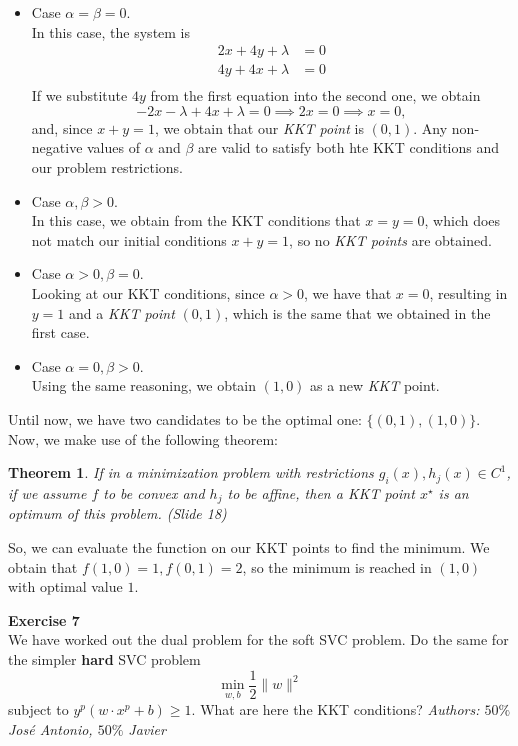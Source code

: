 \documentclass[11pt,table]{article}
\newtheorem{nth}{Theorem}
\newenvironment{problem}[2][Exercise]
{ \begin{mdframed}[backgroundcolor=gray!20] \textbf{#1 #2} \\}
	{\hspace{0.0cm}\newline\newline \emph{Authors: \(50\%\) José Antonio, \(50\%\) Javier}  \end{mdframed}}
\newcommand\norm[1]{\lVert#1\rVert}
\begin{document}
	\begin{itemize}
		\item Case \(\alpha = \beta = 0\).\\
		In this case, the system is
		\begin{align*}
			2x + 4y + \lambda & = 0 \\
			4y + 4x + \lambda & = 0 \\
		\end{align*}
		If we substitute \(4y\) from the first equation into the second one, we obtain
		\[
		-2x - \lambda + 4x + \lambda = 0 \implies 2x = 0  \implies x = 0,
		\]
		and, since \(x+y = 1\), we obtain that our \emph{KKT point} is \((0,1)\). Any non-negative values of $\alpha$ and $\beta$ are valid to satisfy both hte KKT conditions and our problem restrictions.
		\item Case \(\alpha, \beta > 0\).\\
		In this case, we obtain from the KKT conditions that \(x=  y = 0\), which does not match our initial conditions \(x+y = 1\), so no \emph{KKT points} are obtained.
		\item Case \(\alpha > 0, \beta = 0\).\\
		Looking at our KKT conditions, since \(\alpha > 0\), we have that \(x = 0\), resulting in \(y=1\) and a \emph{KKT point} \((0,1)\), which is the same that we obtained in the first case.\\
		\item Case \(\alpha = 0, \beta > 0\).\\
		Using the same reasoning, we obtain \((1,0)\) as a new \emph{KKT} point.
	\end{itemize}
	
	Until now, we have two candidates to be the optimal one: \(\{(0,1),(1,0)\}\). Now, we make use of the following theorem:
	
	\begin{nth}
		If in a minimization problem with restrictions \(g_i(x), h_j(x) \in C^1\), if we assume \(f\) to be convex and \(h_j\) to be affine, then a KKT point \(x^\star\) is an optimum of this problem. (Slide 18)
	\end{nth}
	
	So, we can evaluate the function on our KKT points to find the minimum. We obtain that \(f(1,0) = 1, f(0,1) = 2\), so the minimum is reached in \((1,0)\) with optimal value \(1\). \\
	
	\begin{problem}{7}
		We have worked out the dual problem for the soft SVC problem. Do the same for the simpler \textbf{hard} SVC problem
		\[
		\min_{w,b} \frac{1}{2} \norm{w}^2
		\]
		subject to \(y^p\left(w \cdot x^p + b\right) \geq 1\). What are here the KKT conditions?
	\end{problem}
	
\end{document}
